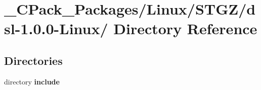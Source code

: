 \section{\_\-CPack\_\-Packages/Linux/STGZ/dsl-\/1.0.0-\/Linux/ Directory Reference}
\label{dir_1e99ddaa554ebbc7e8f1613cb1b777d5}
\subsection*{Directories}
\begin{DoxyCompactItemize}
\item 
directory {\bf include}
\end{DoxyCompactItemize}
